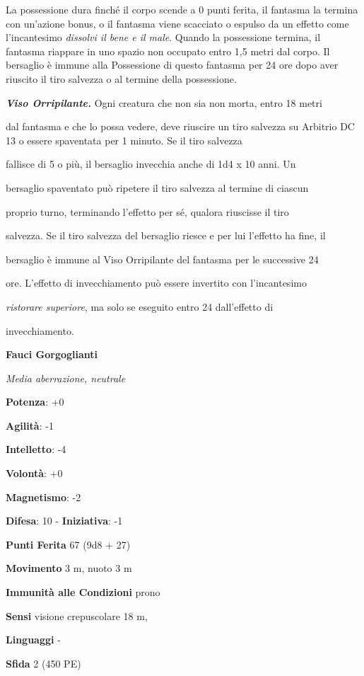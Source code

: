 \begin{multicols}{2}
La possessione dura finché il corpo scende a 0 punti ferita, il fantasma
la termina con un'azione bonus, o il fantasma viene scacciato o espulso
da un effetto come l'incantesimo \emph{dissolvi il bene e il male}.
Quando la possessione termina, il fantasma riappare in uno spazio non
occupato entro 1,5 metri dal corpo. Il bersaglio è immune alla
Possessione di questo fantasma per 24 ore dopo aver riuscito il tiro
salvezza o al termine della possessione.

\emph{\textbf{Viso Orripilante.}} Ogni creatura che non sia non morta,
entro 18 metri

dal fantasma e che lo possa vedere, deve riuscire un tiro salvezza su Arbitrio DC 13 o essere spaventata per 1 minuto. Se il tiro salvezza

fallisce di 5 o più, il bersaglio invecchia anche di 1d4 x 10 anni. Un

bersaglio spaventato può ripetere il tiro salvezza al termine di ciascun

proprio turno, terminando l'effetto per sé, qualora riuscisse il tiro

salvezza. Se il tiro salvezza del bersaglio riesce e per lui l'effetto
ha fine, il

bersaglio è immune al Viso Orripilante del fantasma per le successive 24

ore. L'effetto di invecchiamento può essere invertito con l'incantesimo

\emph{ristorare superiore}, ma solo se eseguito entro 24 dall'effetto di

invecchiamento.

\textbf{Fauci Gorgoglianti}

\emph{Media aberrazione, neutrale}

\textbf{Potenza}: +0

\textbf{Agilità}: -1

\textbf{Intelletto}: -4

\textbf{Volontà}: +0

\textbf{Magnetismo}: -2

\textbf{Difesa}: 10 - \textbf{Iniziativa}: -1

\textbf{Punti Ferita} 67 (9d8 + 27)

\textbf{Movimento} 3 m, nuoto 3 m

\textbf{Immunità alle Condizioni} prono

\textbf{Sensi} visione crepuscolare 18 m, 

\textbf{Linguaggi} -

\textbf{Sfida} 2 (450 PE)


\end{multicols}
